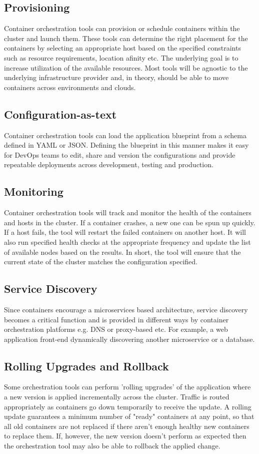 \documentclass[sigconf]{acmart}
\begin{document}
	\subsection{Provisioning}
	Container orchestration tools can provision or schedule containers within the cluster and launch them. These tools can
	determine the right placement for the containers by selecting an appropriate host based on the specified constraints such
	as resource requirements, location afinity etc. The underlying goal is to increase utilization of the available resources.
	Most tools will be agnostic to the underlying infrastructure provider and, in theory, should be able to move containers
	across environments and clouds. \cite{Provisioning}
	\subsection{Configuration-as-text}
	Container orchestration tools can load the application blueprint from a schema defined in YAML or JSON. Defining the
	blueprint in this manner makes it easy for DevOps teams to edit, share and version the configurations and provide repeatable
	deployments across development, testing and production.  \cite{Configuration-as-text}
	\subsection{Monitoring}
	Container orchestration tools will track and monitor the health of the containers and hosts in the cluster. If a container
	crashes, a new one can be spun up quickly. If a host fails, the tool will restart the failed containers on another host. It will also
	run specified health checks at the appropriate frequency and update the list of available nodes based on the results. In short,
	the tool will ensure that the current state of the cluster matches the configuration specified. 

	\subsection{Service Discovery}
	Since containers encourage a microservices based architecture, service discovery becomes a critical function and is provided
	in different ways by container orchestration platforms e.g. DNS or proxy-based etc. For example, a web application front-end
	dynamically discovering another microservice or a database. 
	\subsection{Rolling Upgrades and Rollback }
	Some orchestration tools can perform 'rolling upgrades' of the application where a new version is applied incrementally
	across the cluster. Traffic is routed appropriately as containers go down temporarily to receive the update. A rolling update
	guarantees a minimum number of "ready" containers at any point, so that all old containers are not replaced if there aren't
	enough healthy new containers to replace them. If, however, the new version doesn't perform as expected then the
	orchestration tool may also be able to rollback the applied change. 
\end{document}
